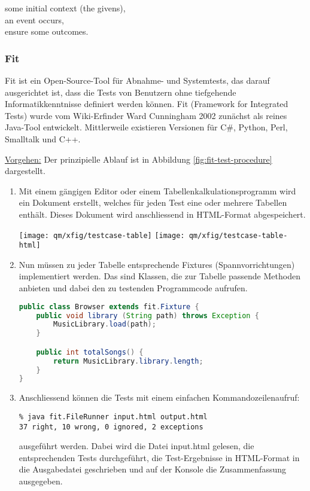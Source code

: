  some initial context (the givens),\\
 an event occurs,\\
 ensure some outcomes.
\newslide
%
\subsubsection{Fit}
Fit ist ein Open-Source-Tool für Abnahme- und Systemtests, das
darauf ausgerichtet ist, dass die Tests von Benutzern ohne tiefgehende
Informatikkenntnisse definiert werden können.
Fit (Framework for Integrated Tests) wurde vom Wiki-Erfinder Ward Cunningham
2002 zunächst als reines Java-Tool entwickelt. Mittlerweile existieren
Versionen für C\#, Python, Perl, Smalltalk und C++.

\ifslides
\newslide
\underline{Vorgehen:}
\else
Der prinzipielle Ablauf ist in Abbildung \ref{fig:fit-test-procedure}
dargestellt.
\fi
\begin{enumerate}
\item Mit einem gängigen Editor oder einem
Tabellenkalkulationsprogramm wird ein Dokument erstellt, welches für jeden
Test eine oder mehrere Tabellen enthält.
Dieses Dokument wird anschliessend in HTML-Format abgespeichert.

\texttt{[image: qm/xfig/testcase-table]}
\hfill
\texttt{[image: qm/xfig/testcase-table-html]}
\newslide
\item Nun müssen zu jeder Tabelle entsprechende
Fixtures (Spannvorrichtungen) implementiert werden. Das sind Klassen, die
zur Tabelle passende Methoden anbieten und dabei den zu testenden Programmcode
aufrufen.
\begin{lstlisting}[language=java]
public class Browser extends fit.Fixture {
    public void library (String path) throws Exception {
        MusicLibrary.load(path);
    }

    public int totalSongs() {
        return MusicLibrary.library.length;
    }
}
\end{lstlisting}
\newslide
\item Anschliessend können die Tests mit einem einfachen
Kommandozeilenaufruf:
\begin{verbatim}
% java fit.FileRunner input.html output.html
37 right, 10 wrong, 0 ignored, 2 exceptions
\end{verbatim}
ausgeführt werden. Dabei wird die Datei input.html gelesen, die
entsprechenden Tests durchgeführt,
die Test-Ergebnisse in HTML-Format
in die Ausgabedatei
geschrieben und auf der Konsole die Zusammenfassung ausgegeben.
\end{enumerate}

